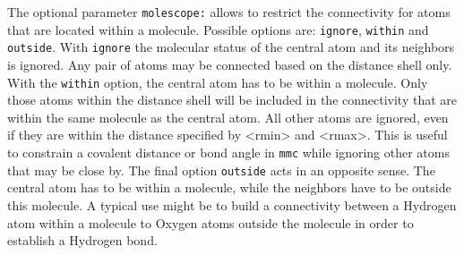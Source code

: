 The optional parameter {\tt molescope:} allows to restrict the 
connectivity for atoms that are located within a molecule. 
Possible options are: {\tt ignore}, {\tt within} and {\tt outside}.
With {\tt ignore} the molecular status of the central atom and its 
neighbors is ignored. Any pair of atoms may be connected based on the
distance shell only. With the {\tt within} option, the central atom 
has to be within a molecule. Only those atoms within the distance shell
will be included in the connectivity that are within the same molecule
as the central atom. All other atoms are ignored, even if they are 
within the distance specified by <rmin> and <rmax>. This is useful
to constrain a covalent distance or bond angle in {\tt mmc}
while ignoring other atoms that may be close by.
The final option {\tt outside} acts in an opposite sense. The central 
atom has to be within a molecule, while the neighbors have to be 
outside this molecule. A typical use might be to build a connectivity
between a Hydrogen atom within a molecule to Oxygen atoms outside 
the molecule in order to establish a Hydrogen bond.

